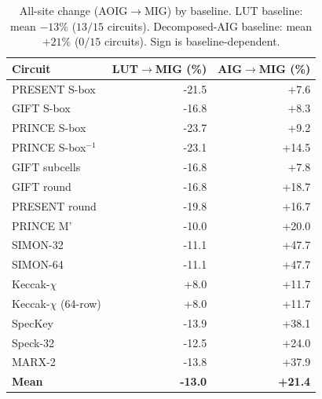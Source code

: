 \begin{table}[t]
\centering
\caption{All-site \AvgDP{} change (AOIG$\to$MIG) by baseline. LUT baseline: mean $-13\%$ ($13/15$ circuits). Decomposed-AIG baseline: mean $+21\%$ ($0/15$ circuits). Sign is baseline-dependent.}
\label{tab:granularity_confound}
\begin{tabular}{lrr}
\toprule
Circuit & LUT$\to$MIG (\%) & AIG$\to$MIG (\%) \\
\midrule
PRESENT S-box & -21.5 & +7.6 \\
GIFT S-box & -16.8 & +8.3 \\
PRINCE S-box & -23.7 & +9.2 \\
PRINCE S-box$^{-1}$ & -23.1 & +14.5 \\
GIFT subcells & -16.8 & +7.8 \\
GIFT round & -16.8 & +18.7 \\
PRESENT round & -19.8 & +16.7 \\
PRINCE M' & -10.0 & +20.0 \\
SIMON-32 & -11.1 & +47.7 \\
SIMON-64 & -11.1 & +47.7 \\
Keccak-$\chi$ & +8.0 & +11.7 \\
Keccak-$\chi$ (64-row) & +8.0 & +11.7 \\
SpecKey & -13.9 & +38.1 \\
Speck-32 & -12.5 & +24.0 \\
MARX-2 & -13.8 & +37.9 \\
\midrule
\textbf{Mean} & \textbf{-13.0} & \textbf{+21.4} \\
\bottomrule
\end{tabular}
\end{table}
